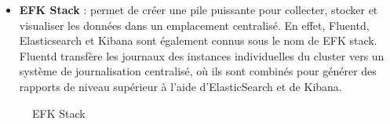 \begin{itemize}
\begin{table}[H]
\begin{center}
\begin{tabularx}{\textwidth}{ |p{5cm}|X|X|X|X| }
\end{tabularx}
\caption{Configuration SonarQube}
\end{center}
\end{table}


\textcolor{red}{\textbf{Remarque}} : On donne la note (Rate) suivant les r\`egles suivantes :

\begin{itemize}
\item <=5\% la note est A
\item entre 6 to 10\% la note est B
\item entre 11 to 20\% la note est C
\item entre 21 to 50\% la note est D
\item >50\% la note est E
\end{itemize}

\item \textbf{EFK Stack} : permet de cr\'eer une pile puissante pour collecter, stocker et visualiser les donn\'ees dans un emplacement centralis\'e. En effet, Fluentd, Elasticsearch et Kibana sont \'egalement connus sous le nom de EFK stack. Fluentd transf\`ere les journaux des instances individuelles du cluster vers un syst\`eme de journalisation centralis\'e, o\`u ils sont combin\'es pour g\'en\'erer des rapports de niveau sup\'erieur \`a l'aide d'ElasticSearch et de Kibana.
\end{itemize}


\begin{figure}[H]
	\caption{\label{fig:my-label} EFK Stack}
\end{figure}


